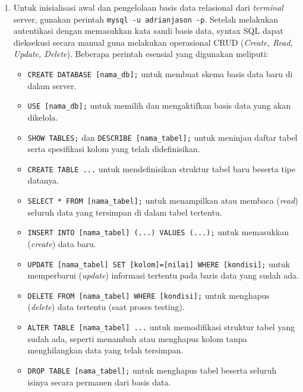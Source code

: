 \begin{enumerate}[label=\alph*.]
    Agar perubahan kode tersebut dapat diterapkan sepenuhnya pada situs web, perlu dilakukan \textit{restart} layanan pada server dengan \textit{process manager} \textbf{PM2}. Langkah-langkahnya dimulai dengan menjalankan perintah \texttt{pm2 list} untuk melihat daftar serta status layanan yang sedang berjalan. Setelah mengidentifikasi identitas layanan yang dimaksud, jalankan perintah \texttt{pm2 restart [ID]} (contoh: \texttt{pm2 restart 0} apabila layanan aplikasi memiliki ID 0). Proses ini diakhiri dengan perintah \texttt{pm2 save} untuk memastikan konfigurasi status layanan tersebut tersimpan secara permanen pada server.
  
    \item Untuk inisialisasi awal dan pengelolaan basis data relasional dari \textit{terminal} server, gunakan perintah \texttt{mysql -u adrianjason -p}. Setelah melakukan autentikasi dengan memasukkan kata sandi basis data, syntax SQL dapat dieksekusi secara manual guna melakukan operasional CRUD (\textit{Create, Read, Update, Delete}). Beberapa perintah esensial yang digunakan meliputi:
    \begin{itemize}
        \item \texttt{CREATE DATABASE [nama\_db];} untuk membuat skema basis data baru di dalam server.
        \item \texttt{USE [nama\_db];} untuk memilih dan mengaktifkan basis data yang akan dikelola.
        \item \texttt{SHOW TABLES;} dan \texttt{DESCRIBE [nama\_tabel];} untuk meninjau daftar tabel serta spesifikasi kolom yang telah didefinisikan.
        \item \texttt{CREATE TABLE ...} untuk mendefinisikan struktur tabel baru beserta tipe datanya.
        \item \texttt{SELECT * FROM [nama\_tabel];} untuk menampilkan atau membaca (\textit{read}) seluruh data yang tersimpan di dalam tabel tertentu.
        \item \texttt{INSERT INTO [nama\_tabel] (...) VALUES (...);} untuk memasukkan (\textit{create}) data baru.
        \item \texttt{UPDATE [nama\_tabel] SET [kolom]=[nilai] WHERE [kondisi];} untuk memperbarui (\textit{update}) informasi tertentu pada baris data yang sudah ada.
        \item \texttt{DELETE FROM [nama\_tabel] WHERE [kondisi];} untuk menghapus (\textit{delete}) data tertentu (saat proses testing).
        \item \texttt{ALTER TABLE [nama\_tabel] ...} untuk memodifikasi struktur tabel yang sudah ada, seperti menambah atau menghapus kolom tanpa menghilangkan data yang telah tersimpan.
        \item \texttt{DROP TABLE [nama\_tabel];} untuk menghapus tabel beserta seluruh isinya secara permanen dari basis data.
    \end{itemize}


    
\end{enumerate}





